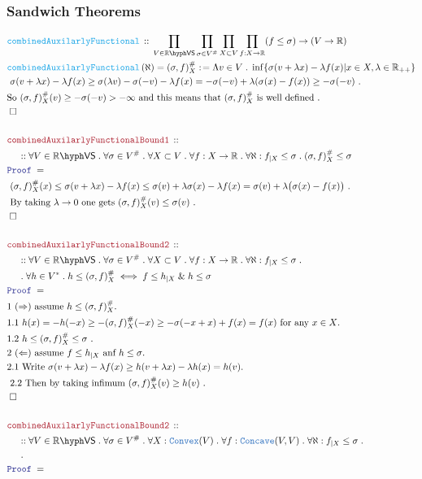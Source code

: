 \documentclass[12pt]{scrartcl}
\newcommand{\TYPE}[1]{\textcolor{NavyBlue}{\mathtt{#1}}}
\newcommand{\FUNC}[1]{\textcolor{Cerulean}{\mathtt{#1}}}
\newcommand{\LOGIC}[1]{\textcolor{Blue}{\mathtt{#1}}}
\newcommand{\THM}[1]{\textcolor{Maroon}{\mathtt{#1}}}
\renewcommand{\.}{\; . \;}
\newcommand{\de}{: \kern 0.1pc =}
\newcommand{\Act}[1]{\left( #1 \right)}
\newcommand{\Theorem}[2]{& \THM{#1} \, :: \, #2 \\ & \Proof = \\ }
\newcommand{\DeclareFunc}[2]{& \FUNC{#1} \, :: \, #2 \\}
\newcommand{\DefineNamedFunc}[4]{&  \FUNC{#1}\Act{#2} = #3 \de #4 \\}
\newcommand{\NewLine}{\\ & \kern 1pc}
\newcommand{\Page}[1]{ \begin{align*} #1 \end{align*}   }
\newcommand{\Explain}[1]{& \text{#1.} \\}
\renewcommand{\And}{\; \& \;}
\newcommand{\Reals}{\mathbb{R} }
\newcommand{\QED}{\; \square}
\newcommand{\EndProof}{& \QED \\}
\newcommand{\Proof}{\LOGIC{Proof} \; }
\newcommand{\VS}[1]{#1\hyph\mathsf{VS}} %
\newcommand{\Convex}{\TYPE{Convex}}
\begin{document}
\subsubsection{Sandwich Theorems}
\Page{
	\DeclareFunc{combinedAuxilarlyFunctional}
	{
		\prod_{V \in \VS{\Reals}}
		\prod_{ \sigma \in V^\#} 
		\prod_{X \subset V}
		\prod_{f : X \to \Reals}
		(f \le \sigma) \to  (V \to \Reals)
	}
	\DefineNamedFunc{combinedAuxilarlyFunctional}{\aleph}{(\sigma,f)_X^\#}
	{
		\Lambda v \in V \. \inf \{ \sigma(v + \lambda x) - \lambda f(x)  | x \in X, \lambda \in \Reals_{++}\}
	}
	\Explain{
		$
			\sigma(v + \lambda x) - \lambda f(x) \ge  \sigma(\lambda v)  - \sigma(-v) - \lambda f(x) =
			-\sigma(-v)  + \lambda(\sigma(x) - f(x)) \ge - \sigma(-v)
		$
	}
	\Explain{So $(\sigma,f)_X^\#(v) \ge -\sigma(-v) > - \infty$ and this means that
		$(\sigma,f)_X^\#$ is well defined }
	\EndProof
	\\
	\Theorem{combinedAuxilarlyFunctionalBound1}
	{	
		\NewLine ::		
		\forall V \in \VS{\Reals} \.
		\forall \sigma\in V^\# \.
		\forall X \subset V \.
		\forall f : X \to \Reals  \.
		\forall \aleph  : f_{|X} \le \sigma \.
		(\sigma, f)_X^\# \le \sigma
	}
	\Explain{
			$
				(\sigma, f)_X^\#(x) \le  
				\sigma(v + \lambda x) - \lambda f(x) \le    
				\sigma(v) + \lambda \sigma(x) -\lambda f(x)  = 
				\sigma(v) + \lambda \big( \sigma(x) - f(x) \big)
			$
	}
	\Explain{
		By taking $\lambda \to 0$ one gets $(\sigma, f)_X^\#(v) \le \sigma(v)$
	}
	\EndProof
	\\
	\Theorem{combinedAuxilarlyFunctionalBound2}
	{	
		\NewLine ::		
		\forall V \in \VS{\Reals} \.
		\forall \sigma\in V^\# \.
		\forall X \subset V \.
		\forall f : X \to \Reals  \.
		\forall \aleph : f_{|X} \le \sigma \. \NewLine \.
		\forall h \in V^* \.
		h \le (\sigma, f)_X^\#
		\iff
		f \le h_{|X} \And h \le \sigma 
	}
	\Explain{1 $(\Rightarrow)$ assume $h \le (\sigma, f)_X^\#$}
	\Explain{1.1 $ h(x) =  -h(-x) \ge - (\sigma, f)_X^\#(-x) \ge 
	 -\sigma(-x + x)  +  f(x) = f(x) $ for any $x \in X$}	
	\Explain{1.2  $h \le (\sigma, f)_X^\# \le \sigma$  }
	\Explain{2 $(\Leftarrow)$ assume $f \le h_{|X}$ anf $h \le \sigma$}
	\Explain{2.1
		Write
		$
			\sigma(v + \lambda x) - \lambda f(x) \ge 
			h( v + \lambda x) - \lambda h(x) = h(v) 		
		$}
	\Explain{ 2.2
		Then by taking infimum $ (\sigma,f)^\#_X(v) \ge h(v)$ 
	}
	\EndProof
	\\
	\Theorem{combinedAuxilarlyFunctionalBound2}
	{	
		\NewLine ::		
		\forall V \in \VS{\Reals} \.
		\forall \sigma\in V^\# \.
		\forall X : \Convex(V) \.
		\forall f : \TYPE{Concave}(V,V) \.
		\forall \aleph : f_{|X} \le \sigma \. \NewLine \.
}}
\end{document}

